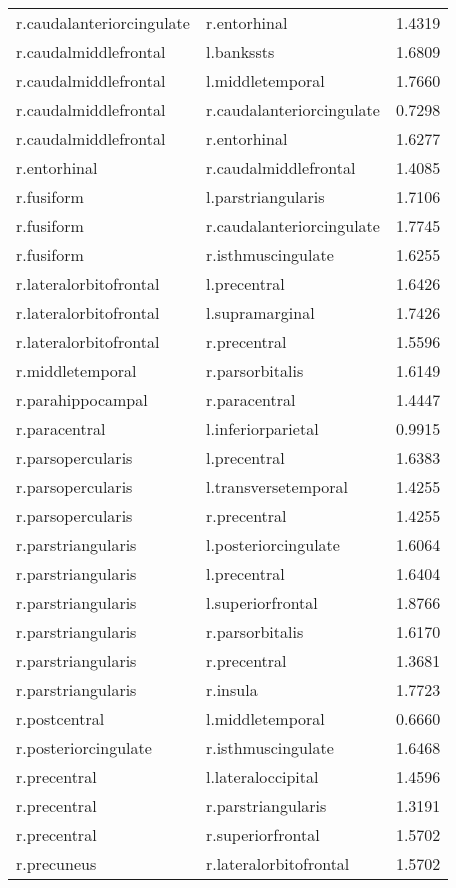 \begin{table}
\begin{tabular}{llr}
r.caudalanteriorcingulate & r.entorhinal & 1.4319 \\
r.caudalmiddlefrontal & l.bankssts & 1.6809 \\
r.caudalmiddlefrontal & l.middletemporal & 1.7660 \\
r.caudalmiddlefrontal & r.caudalanteriorcingulate & 0.7298 \\
r.caudalmiddlefrontal & r.entorhinal & 1.6277 \\
r.entorhinal & r.caudalmiddlefrontal & 1.4085 \\
r.fusiform & l.parstriangularis & 1.7106 \\
r.fusiform & r.caudalanteriorcingulate & 1.7745 \\
r.fusiform & r.isthmuscingulate & 1.6255 \\
r.lateralorbitofrontal & l.precentral & 1.6426 \\
r.lateralorbitofrontal & l.supramarginal & 1.7426 \\
r.lateralorbitofrontal & r.precentral & 1.5596 \\
r.middletemporal & r.parsorbitalis & 1.6149 \\
r.parahippocampal & r.paracentral & 1.4447 \\
r.paracentral & l.inferiorparietal & 0.9915 \\
r.parsopercularis & l.precentral & 1.6383 \\
r.parsopercularis & l.transversetemporal & 1.4255 \\
r.parsopercularis & r.precentral & 1.4255 \\
r.parstriangularis & l.posteriorcingulate & 1.6064 \\
r.parstriangularis & l.precentral & 1.6404 \\
r.parstriangularis & l.superiorfrontal & 1.8766 \\
r.parstriangularis & r.parsorbitalis & 1.6170 \\
r.parstriangularis & r.precentral & 1.3681 \\
r.parstriangularis & r.insula & 1.7723 \\
r.postcentral & l.middletemporal & 0.6660 \\
r.posteriorcingulate & r.isthmuscingulate & 1.6468 \\
r.precentral & l.lateraloccipital & 1.4596 \\
r.precentral & r.parstriangularis & 1.3191 \\
r.precentral & r.superiorfrontal & 1.5702 \\
r.precuneus & r.lateralorbitofrontal & 1.5702 \\

\end{tabular}
\end{table}
